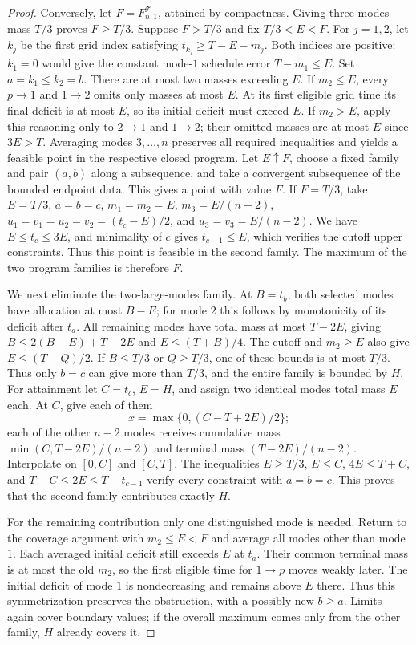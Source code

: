 \begin{proof}
Conversely, let $F=F^{\mathcal T}_{n,1}$, attained by compactness.
Giving three modes mass $T/3$ proves $F\ge T/3$. Suppose $F>T/3$ and
fix $T/3<E<F$. For $j=1,2$, let $k_j$ be the first grid index satisfying
$t_{k_j}\ge T-E-m_j$. Both indices are positive: $k_1=0$ would give
the constant mode-$1$ schedule error $T-m_1\le E$. Set $a=k_1\le k_2=b$.
There are at most two masses exceeding $E$.
If $m_2\le E$, every $p\to1$ and $1\to2$ omits only masses at most
$E$. At its first eligible grid time its final deficit is at most $E$,
so its initial deficit must exceed $E$.
If $m_2>E$, apply this reasoning only to $2\to1$ and $1\to2$; their
omitted masses are at most $E$ since $3E>T$.
Averaging modes $3,\ldots,n$ preserves all required inequalities and yields
a feasible point in the respective closed program. Let $E\uparrow F$,
choose a fixed family and pair $(a,b)$ along a subsequence, and take a
convergent subsequence of the bounded endpoint data. This gives a point
with value $F$.
If $F=T/3$, take $E=T/3$, $a=b=c$, $m_1=m_2=E$,
$m_3=E/(n-2)$, $u_1=v_1=u_2=v_2=(t_c-E)/2$, and
$u_3=v_3=E/(n-2)$. We have $E\le t_c\le3E$, and minimality of $c$
gives $t_{c-1}\le E$, which verifies the cutoff upper constraints. Thus
this point is feasible in the second family. The maximum of the two program
families is therefore $F$.

We next eliminate the two-large-modes family. At $B=t_b$, both selected
modes have allocation at most $B-E$; for mode $2$ this follows by
monotonicity of its deficit after $t_a$. All remaining modes have total
mass at most $T-2E$, giving $B\le2(B-E)+T-2E$ and
$E\le(T+B)/4$. The cutoff and $m_2\ge E$ also give
$E\le(T-Q)/2$. If $B\le T/3$ or $Q\ge T/3$, one of these bounds is at most
$T/3$. Thus only $b=c$ can give more than $T/3$, and the entire family
is bounded by $H$.
For attainment let $C=t_c$, $E=H$, and assign two identical modes total
mass $E$ each. At $C$, give each of them
\begin{equation}\label{eq:grid-H-witness}
 x=\max\{0,(C-T+2E)/2\};
\end{equation}
each of the other $n-2$ modes receives cumulative mass
$\min(C,T-2E)/(n-2)$ and terminal mass $(T-2E)/(n-2)$.
Interpolate on $[0,C]$ and $[C,T]$.
The inequalities $E\ge T/3$, $E\le C$, $4E\le T+C$, and
$T-C\le2E\le T-t_{c-1}$ verify every constraint with $a=b=c$.
This proves that the second family contributes exactly $H$.

For the remaining contribution only one distinguished mode is needed.
Return to the coverage argument with $m_2\le E<F$ and average all
modes other than mode $1$. Each averaged initial deficit still exceeds
$E$ at $t_a$. Their common terminal mass is at most the old $m_2$, so
the first eligible time for $1\to p$ moves weakly later. The initial
deficit of mode $1$ is nondecreasing and remains above $E$ there.
Thus this symmetrization preserves the obstruction, with a possibly new
$b\ge a$. Limits again cover boundary values; if the overall maximum
comes only from the other family, $H$ already covers it.


\end{proof}
